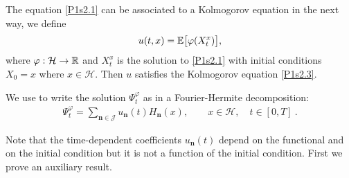 \documentclass[review,onefignum,onetabnum]{siamart190516}
\begin{document}
    The equation \eqref{P1s2.1} can be associated to a Kolmogorov equation in 
    the next way, we define
    \begin{equation}
    \label{P1s2.2}
        u(t,x) = \E \big[ \varphi(X_t^x) \big],
    \end{equation}
    where $\varphi:\mathcal{H}\rightarrow {\mathbb R}$ and $X_t^x$ is the solution to
    \eqref{P1s2.1} with initial conditions $X_0=x$ where
    $x\in\mathcal{H}$. Then $u$ satisfies the Kolmogorov equation
    \eqref{P1s2.3}.
    
        We use  to write the solution $\Psi_t^\varphi$ as in a
    Fourier-Hermite decomposition:
    \begin{align}
        \Psi_t ^ \varphi=
            \sum_{\bm{n}\in \mathcal{J}}
            u_{\bm{n}}(t) H_{\bm{n}}(x),
            \qquad
            x \in \mathcal{H},
            \quad t \in [0,T] \ .
            \label{num-approx}
    \end{align}

        Note that the time-dependent coefficients $ u_{\bm{n}}(t)$ depend on the
    functional and on the initial condition but it is not a function of
    the initial condition. First we prove an auxiliary result.
\end{document}
